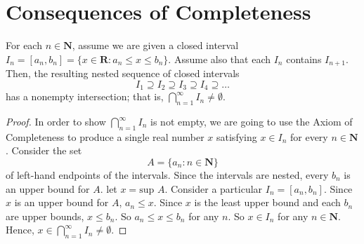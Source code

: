 \section{Consequences of Completeness}
    \begin{theorem}
        For each $n \in \textbf{N}$, assume we are given a closed interval $I_n = [a_n, b_n] = \{x \in \textbf{R}: a_n \leq x \leq b_n\}$. Assume also that each $I_n$ contains $I_{n+1}$. Then, the resulting nested sequence of closed intervals
        \begin{equation*}
            I_1 \supseteq I_2 \supseteq I_3 \supseteq I_4 \supseteq \dots
        \end{equation*}
        has a nonempty intersection; that is, $\bigcap_{n=1}^{\infty} I_n \neq \emptyset$.
    \end{theorem}
    \begin{proof}
        In order to show $\bigcap_{n=1}^{\infty} I_n$ is not empty, we are going to use the Axiom of Completeness to produce a single real number $x$ satisfying $x \in I_n$ for every $n \in \textbf{N}$. Consider the set
        \begin{equation*}
            A = \{a_n : n \in \textbf{N}\}
        \end{equation*}
        of left-hand endpoints of the intervals. Since the intervals are nested, every $b_n$ is an upper bound for $A$. let $x = \text{sup } A$. Consider a particular $I_n = [a_n, b_n]$. Since $x$ is an upper bound for $A$, $a_n \leq x$. Since $x$ is the least upper bound and each $b_n$ are upper bounds, $x \leq b_n$. So $a_n \leq x \leq b_n$ for any $n$. So $x \in I_n$ for any $n \in \textbf{N}$. Hence, $x \in \bigcap_{n=1}^{\infty} I_n \neq \emptyset$.
    \end{proof}
